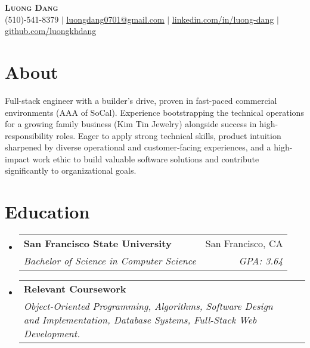 \documentclass[letterpaper,10pt]{article}
\makeatletter
\newcommand{\resumeSubheading}[4]{
  \vspace{-3pt}\item %
  \begin{tabular*}{0.97\textwidth}[t]{l@{\extracolsep{\fill}}r} %
    \textbf{#1} & #2 \\
    \textit{\small#3} & \textit{\small #4} \\
  \end{tabular*}\vspace{-8pt} %
}
\newcommand{\resumeSubHeadingListStart}{\begin{itemize}[leftmargin=0.15in, label={}]} %
\newcommand{\resumeSubHeadingListEnd}{\end{itemize}} %
\makeatother
\begin{document}
\begin{center}
    \textbf{\Huge \scshape Luong Dang} \\ \vspace{1pt} %
    \small %
    (510)-541-8379 $|$
    \href{mailto:luongdang0701@gmail.com}{\underline{luongdang0701@gmail.com}} $|$
    \href{https://linkedin.com/in/luong-dang}{\underline{linkedin.com/in/luong-dang}} $|$
    \href{https://github.com/luongkhdang}{\underline{github.com/luongkhdang}}
\end{center}

\section{About}
\vspace{2pt} %
\small{\justifying %
Full-stack engineer with a builder's drive, proven in fast-paced commercial environments (AAA of SoCal). Experience bootstrapping the technical operations for a growing family business (Kim Tin Jewelry) alongside success in high-responsibility roles. Eager to apply strong technical skills, product intuition sharpened by diverse operational and customer-facing experiences, and a high-impact work ethic to build valuable software solutions and contribute significantly to organizational goals.
} %
\vspace{4pt} %

\section{Education}
  \resumeSubHeadingListStart
    \resumeSubheading
      {San Francisco State University}{San Francisco, CA}
      {Bachelor of Science in Computer Science}{GPA: 3.64} %
    \resumeSubheading %
      {Relevant Coursework}{} %
      {Object-Oriented Programming, Algorithms, Software Design and Implementation, Database Systems, Full-Stack Web Development.}{} %
  \resumeSubHeadingListEnd
\end{document}
